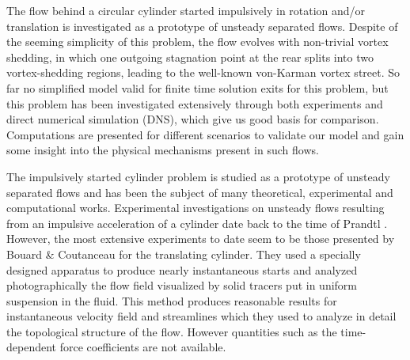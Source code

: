 
The flow behind a circular cylinder started impulsively in rotation and/or translation is investigated as a prototype of unsteady separated flows.
Despite of the seeming simplicity of this problem, the flow evolves with non-trivial vortex shedding, in which one outgoing stagnation point at the rear splits into two vortex-shedding regions, leading to the well-known von-Karman vortex street.
So far no simplified model valid for finite time solution exits for this problem, but this problem has been investigated extensively through both experiments and direct numerical simulation (DNS), which give us good basis for comparison.
Computations are presented for different scenarios to validate our model and gain some insight into the physical mechanisms present in such flows.

The impulsively started cylinder problem is studied as a prototype of unsteady separated flows and has been the subject of many theoretical, experimental and computational works.
Experimental investigations on unsteady flows resulting from an impulsive acceleration of a cylinder date back to the time of Prandtl \cite{prandtl1925magnus}.
However, the most extensive experiments to  date seem to be those presented by Bouard \& Coutanceau \cite{bouard1980early} for the translating cylinder.
They used a specially designed apparatus to produce nearly instantaneous starts and analyzed photographically the flow field visualized by solid tracers put in uniform suspension in the fluid.
This method produces reasonable results for instantaneous velocity field and streamlines which they used to analyze in detail the topological structure of the flow.
However quantities such as the time-dependent force coefficients are not available.

